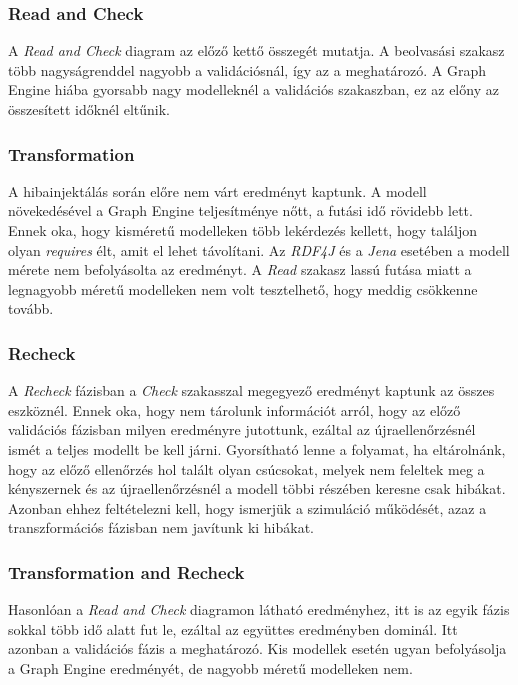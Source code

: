 \subsubsection{Read and Check}

A \emph{Read and Check} diagram az előző kettő összegét mutatja. A beolvasási szakasz több nagyságrenddel nagyobb a validációsnál, így az a meghatározó. A Graph Engine hiába gyorsabb nagy modelleknél a validációs szakaszban, ez az előny az összesített időknél eltűnik. 

\subsubsection{Transformation}

A hibainjektálás során előre nem várt eredményt kaptunk. A modell növekedésével a Graph Engine teljesítménye nőtt, a futási idő rövidebb lett. Ennek oka, hogy kisméretű modelleken több lekérdezés kellett, hogy találjon olyan \emph{requires} élt, amit el lehet távolítani. Az \emph{RDF4J} és a \emph{Jena} esetében a modell mérete nem befolyásolta az eredményt. A \emph{Read} szakasz lassú futása miatt a legnagyobb méretű modelleken nem volt tesztelhető, hogy meddig csökkenne tovább.

\subsubsection{Recheck}

A \emph{Recheck} fázisban a \emph{Check} szakasszal megegyező eredményt kaptunk az összes eszköznél. Ennek oka, hogy nem tárolunk információt arról, hogy az előző validációs fázisban milyen eredményre jutottunk, ezáltal az újraellenőrzésnél ismét a teljes modellt be kell járni. Gyorsítható lenne a folyamat, ha eltárolnánk, hogy az előző ellenőrzés hol talált olyan csúcsokat, melyek nem feleltek meg a kényszernek és az újraellenőrzésnél a modell többi részében keresne csak hibákat. Azonban ehhez feltételezni kell, hogy ismerjük a szimuláció működését, azaz a transzformációs fázisban nem javítunk ki hibákat.

\subsubsection{Transformation and Recheck}

Hasonlóan a \emph{Read and Check} diagramon látható eredményhez, itt is az egyik fázis sokkal több idő alatt fut le, ezáltal az együttes eredményben dominál. Itt azonban a validációs fázis a meghatározó. Kis modellek esetén ugyan befolyásolja a Graph Engine eredményét, de nagyobb méretű modelleken nem.


